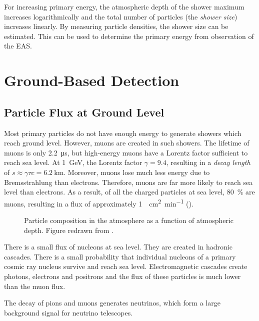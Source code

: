 For increasing primary energy, the atmospheric depth of the shower maximum
increases logarithmically and the total number of particles (the \emph{shower
size}) increases linearly.  By measuring particle densities, the shower size
can be estimated. This can be used to determine the primary energy from
observation of the EAS.


\section{Ground-Based Detection}


\subsection{Particle Flux at Ground Level}
\label{sec:fluxes}

Most primary particles do not have enough energy to generate showers which reach
ground level. However, muons are created in such showers. The lifetime of muons
is only \SI{2.2}{\micro\second}, but high-energy muons have a
Lorentz factor sufficient to reach sea level.  At \SI{1}{\giga\electronvolt}, the Lorentz
factor $\gamma = 9.4$, resulting in a \emph{decay length} of $s \approx \gamma \tau
c = \SI{6.2}{\kilo\meter}$.  Moreover, muons lose much less energy due to
Bremsstrahlung than electrons.  Therefore, muons are
far more likely to reach sea level than electrons.  As a result, of all the
charged particles at sea level, \SI{80}{\percent} are muons, resulting in a flux
of approximately \SI{1}{\per\centi\meter\squared\per\minute}
().
\begin{figure}
\centering
{

}
\caption{Particle composition in the atmosphere as a function of atmospheric
depth.  Figure redrawn from \cite[145]{Grupen:2005}.}
\label{fig:longitudinal-flux}
\end{figure}

There is a small flux of nucleons at sea level.  They are
created in hadronic cascades.  There is a small probability that individual
nucleons of a primary cosmic ray nucleus survive and reach sea level.
Electromagnetic cascades create photons, electrons and positrons and the flux of
these particles is much lower than the muon flux.

The decay of pions and muons generates neutrinos, which form a large background
signal for neutrino telescopes.

